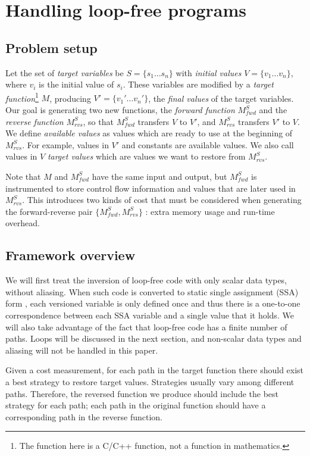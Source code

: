 \documentclass[12pt]{gatech-thesis}
\begin{document}
\section{Handling loop-free programs}


\subsection{Problem setup}
Let the set of \emph{target variables} be $S=\{s_1\dots s_n\}$ with \emph{initial values} $V=\{v_1 \dots v_n\}$, where $v_i$ is the initial value of $s_i$. These variables are modified by a \emph{target function}\footnote{The function here is a C/C++ function, not a function in mathematics.} $M$, producing $V' =\{v_1' \dots v_n'\}$, the \emph{final values} of the target variables. Our goal is generating two new functions, the \emph{forward function} $M^S_{fwd}$ and the \emph{reverse function} $M^S_{rvs}$, so that $M^S_{fwd}$ transfers $V$ to $V'$, and $M^S_{rvs}$ transfers $V'$ to $V$. We define \emph{available values} as values which are ready to use at the beginning of $M^S_{rvs}$. For example, values in $V'$ and constants are available values. We also call values in $V$ \emph{target values} which are values we want to restore from $M^S_{rvs}$.


Note that $M$ and $M^S_{fwd}$ have the same input and output, but $M^S_{fwd}$ is instrumented to store control flow information and values that are later used in $M^S_{rvs}$. 
This introduces two kinds of cost that must be considered when generating the forward-reverse pair $\{M^S_{fwd}, M^S_{rvs}\}$ : 
extra memory usage and run-time overhead.  


\subsection{Framework overview}

We will first treat the inversion of loop-free code with only scalar data types, without aliasing.
When such code is converted to static single assignment (SSA) form \cite{Cytron1991}, each versioned variable is only defined once and thus there is a one-to-one correspondence between each SSA variable and a single value that it holds.
We will also take advantage of the fact that loop-free code has a finite number of paths.
Loops will be discussed in the next section, and non-scalar data types and aliasing will not be handled in this paper.

Given a cost measurement, for each path in the target function there should exist a best strategy to restore target values. 
Strategies usually vary among different paths. 
Therefore, the reversed function we produce should include the best strategy for each path; each path in the original function should have a corresponding path in the reverse function. 
\end{document}
